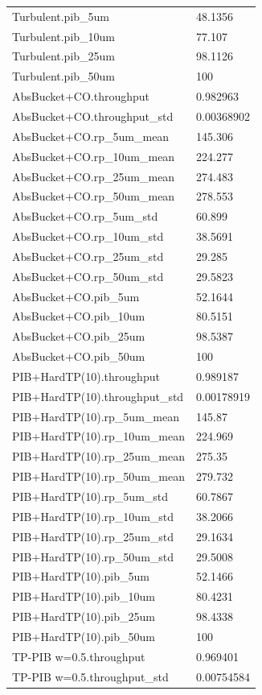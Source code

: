 \begin{longtable}{p{}p{}}
Turbulent.pib\_5um & 48.1356\\
Turbulent.pib\_10um & 77.107\\
Turbulent.pib\_25um & 98.1126\\
Turbulent.pib\_50um & 100\\
AbsBucket+CO.throughput & 0.982963\\
AbsBucket+CO.throughput\_std & 0.00368902\\
AbsBucket+CO.rp\_5um\_mean & 145.306\\
AbsBucket+CO.rp\_10um\_mean & 224.277\\
AbsBucket+CO.rp\_25um\_mean & 274.483\\
AbsBucket+CO.rp\_50um\_mean & 278.553\\
AbsBucket+CO.rp\_5um\_std & 60.899\\
AbsBucket+CO.rp\_10um\_std & 38.5691\\
AbsBucket+CO.rp\_25um\_std & 29.285\\
AbsBucket+CO.rp\_50um\_std & 29.5823\\
AbsBucket+CO.pib\_5um & 52.1644\\
AbsBucket+CO.pib\_10um & 80.5151\\
AbsBucket+CO.pib\_25um & 98.5387\\
AbsBucket+CO.pib\_50um & 100\\
PIB+HardTP(10).throughput & 0.989187\\
PIB+HardTP(10).throughput\_std & 0.00178919\\
PIB+HardTP(10).rp\_5um\_mean & 145.87\\
PIB+HardTP(10).rp\_10um\_mean & 224.969\\
PIB+HardTP(10).rp\_25um\_mean & 275.35\\
PIB+HardTP(10).rp\_50um\_mean & 279.732\\
PIB+HardTP(10).rp\_5um\_std & 60.7867\\
PIB+HardTP(10).rp\_10um\_std & 38.2066\\
PIB+HardTP(10).rp\_25um\_std & 29.1634\\
PIB+HardTP(10).rp\_50um\_std & 29.5008\\
PIB+HardTP(10).pib\_5um & 52.1466\\
PIB+HardTP(10).pib\_10um & 80.4231\\
PIB+HardTP(10).pib\_25um & 98.4338\\
PIB+HardTP(10).pib\_50um & 100\\
TP-PIB w=0.5.throughput & 0.969401\\
TP-PIB w=0.5.throughput\_std & 0.00754584\\

\end{longtable}
